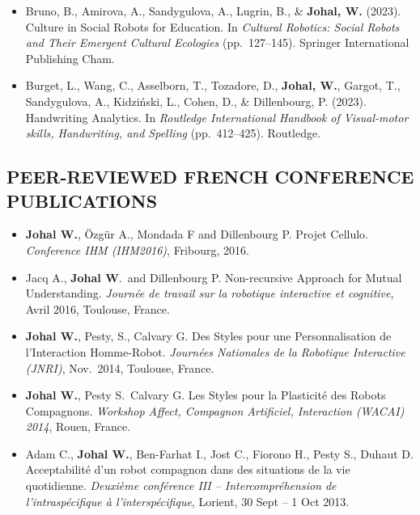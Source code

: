 \begin{itemize}[nosep]
    \renewcommand\labelitemi{$\bullet$}
    \item Bruno, B., Amirova, A., Sandygulova, A., Lugrin, B., \& \textbf{Johal, W.} (2023). Culture in Social Robots for Education. In \textit{Cultural Robotics: Social Robots and Their Emergent Cultural Ecologies} (pp.\ 127--145). Springer International Publishing Cham.

    \item Burget, L., Wang, C., Asselborn, T., Tozadore, D., \textbf{Johal, W.}, Gargot, T., Sandygulova, A., Kidziński, L., Cohen, D., \& Dillenbourg, P. (2023). Handwriting Analytics. In \textit{Routledge International Handbook of Visual-motor skills, Handwriting, and Spelling} (pp.\ 412--425). Routledge.
\end{itemize}

\vspace{0.1in}

\subsection{PEER-REVIEWED FRENCH CONFERENCE PUBLICATIONS}
\vspace{2pt}

\begin{itemize}[nosep]
    \renewcommand\labelitemi{$\bullet$}
    \item \textbf{Johal W.}, Özgür A., Mondada F and Dillenbourg P. Projet Cellulo. \textit{Conference IHM (IHM2016)}, Fribourg, 2016.

    \item Jacq A., \textbf{Johal W}.\ and Dillenbourg P. Non-recursive Approach for Mutual Understanding. \textit{Journée de travail sur la robotique interactive et cognitive}, Avril 2016, Toulouse, France.

    \item \textbf{Johal W.}, Pesty, S., Calvary G. Des Styles pour une Personnalisation de l'Interaction Homme-Robot. \textit{Journées Nationales de la Robotique Interactive (JNRI)}, Nov.\ 2014, Toulouse, France.

    \item \textbf{Johal W.}, Pesty S.\ Calvary G. Les Styles pour la Plasticité des Robots Compagnons. \textit{Workshop Affect, Compagnon Artificiel, Interaction (WACAI) 2014}, Rouen, France.

    \item Adam C., \textbf{Johal W.}, Ben-Farhat I., Jost C., Fiorono H., Pesty S., Duhaut D. Acceptabilité d'un robot compagnon dans des situations de la vie quotidienne. \textit{Deuxième conférence III -- Intercompréhension de l'intraspécifique à l'interspécifique}, Lorient, 30 Sept -- 1 Oct 2013.
\end{itemize}

